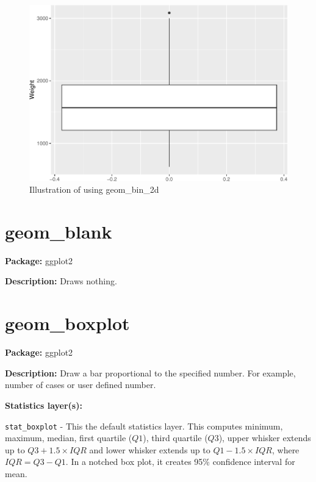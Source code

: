 \documentclass[
]{book}
\begin{document}
\begin{figure}
\centering
\includegraphics{Data-Visualisation-geom-Encyclopedia_files/figure-latex/unnamed-chunk-26-1.pdf}
\caption{\label{fig:unnamed-chunk-26}Illustration of using geom\_bin\_2d}
\end{figure}

\hypertarget{geom_blank}{%
\section{geom\_blank}\label{geom_blank}}

\textbf{Package: } ggplot2 \autocite{R-ggplot2}

\textbf{Description: } Draws nothing.

\hypertarget{geom_boxplot}{%
\section{geom\_boxplot}\label{geom_boxplot}}

\textbf{Package: } ggplot2 \autocite{R-ggplot2}

\textbf{Description: } Draw a bar proportional to the specified number. For example, number of cases or user defined number.

\textbf{Statistics layer(s): }

\texttt{stat\_boxplot} - This the default statistics layer. This computes minimum, maximum, median, first quartile (\(Q1\)), third quartile (\(Q3\)), upper whisker extends up to \(Q3 + 1.5 \times IQR\) and lower whisker extends up to \(Q1 - 1.5 \times IQR\), where \(IQR = Q3 - Q1\). In a notched box plot, it creates 95\% confidence interval for mean.
\end{document}

